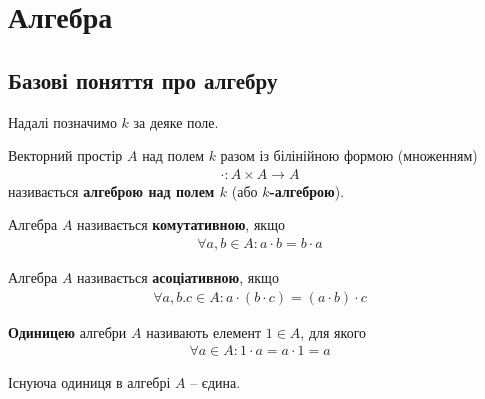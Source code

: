 \documentclass{math_library}
\begin{document}

\fi

\iffalse
\section{Алгебра}
\subsection{Базові поняття про алгебру}
Надалі позначимо $k$ за деяке поле.

\begin{definition}
Векторний простір $A$ над полем $k$ разом із білінійною формою (множенням)
\begin{align*}
\cdot \colon A \times A \to A
\end{align*}
називається \textbf{алгеброю над полем $k$} (або \textbf{$k$-алгеброю}).
\end{definition}

\begin{definition}
Алгебра $A$ називається \textbf{комутативною}, якщо
\begin{align*}
\forall a,b \in A: a \cdot b = b \cdot a
\end{align*}
\end{definition}

\begin{definition}
Алгебра $A$ називається \textbf{асоціативною}, якщо
\begin{align*}
\forall a,b.c \in A: a \cdot (b \cdot c) = (a \cdot b) \cdot c
\end{align*}
\end{definition}

\begin{definition}
\textbf{Одиницею} алгебри $A$ називають елемент $1 \in A$, для якого
\begin{align*}
\forall a \in A: 1 \cdot a = a \cdot 1 = a
\end{align*}
\end{definition}

\begin{proposition}
Існуюча одиниця в алгебрі $A$ -- єдина.
\end{proposition}
\end{document}
